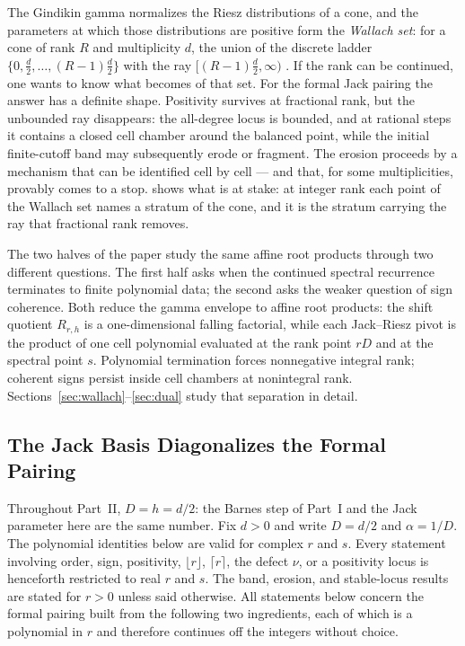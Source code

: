 \documentclass[11pt,letterpaper]{article}
\newcommand{\Rm}{R}                          %
\begin{document}
The Gindikin gamma normalizes the Riesz distributions of a cone, and the
parameters at which those distributions are positive form the \emph{Wallach set}:
for a cone of rank $R$ and multiplicity $d$, the union of the discrete ladder
$\{0,\tfrac{d}{2},\dots,(R-1)\tfrac{d}{2}\}$ with the ray
$[(R-1)\tfrac{d}{2},\infty)$ \cite[Ch.~VII, Ch.~XIII]{FK}. If the rank can be
continued, one wants to know what becomes of that set. For the formal Jack
pairing the answer has a definite shape. Positivity survives at fractional rank,
but the unbounded ray disappears: the all-degree locus is bounded, and at
rational steps it contains a closed cell chamber around the balanced point, while
the initial finite-cutoff band may subsequently erode or fragment. The erosion
proceeds by a mechanism that can be identified cell by cell --- and that, for some
multiplicities, provably comes to a stop.  shows what is at
stake: at integer rank each point of the Wallach set names a stratum of the cone,
and it is the stratum carrying the ray that fractional rank removes.

The two halves of the paper study the same affine root products through two
different questions. The first half asks when the continued spectral recurrence
terminates to finite polynomial data; the second asks the weaker question of
sign coherence. Both reduce the gamma envelope to affine root products: the shift
quotient $\Rm_{r,h}$ is a one-dimensional falling factorial, while each
Jack--Riesz pivot is the product of one cell polynomial evaluated at the rank
point $rD$ and at the spectral point $s$. Polynomial termination forces
nonnegative integral rank; coherent signs persist inside cell chambers at
nonintegral rank. Sections~\ref{sec:wallach}--\ref{sec:dual} study that separation in detail.

\subsection{The Jack Basis Diagonalizes the Formal Pairing}

Throughout Part~II, $D=h=d/2$: the Barnes step of Part~I and the Jack parameter
here are the same number. Fix $d>0$ and write $D=d/2$ and $\alpha=1/D$. The polynomial identities below are
valid for complex $r$ and $s$. Every statement involving order, sign, positivity,
$\lfloor r\rfloor$, $\lceil r\rceil$, the defect $\nu$, or a positivity locus is
henceforth restricted to real $r$ and $s$. The band, erosion, and stable-locus
results are stated for $r>0$ unless said otherwise. All statements below concern
the formal pairing built from the following two ingredients, each of which is a
polynomial in $r$ and therefore continues off the integers without choice.
\end{document}
